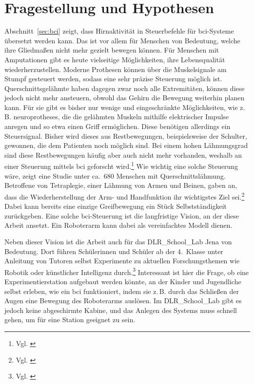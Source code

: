 \section{Fragestellung und Hypothesen}
\label{sec:fragestellung}

Abschnitt~\ref{sec:bci} zeigt, dass Hirnaktivität in Steuerbefehle für \acrshort{bci}-Systeme übersetzt werden kann. Das ist vor allem für Menschen von Bedeutung, welche ihre Gliedmaßen nicht mehr gezielt bewegen können. Für Menschen mit Amputationen gibt es heute vielseitige Möglichkeiten, ihre Lebensqualität wiederherzustellen. Moderne Prothesen können über die Muskelsignale am Stumpf gesteuert werden, sodass eine sehr präzise Steuerung möglich ist. Querschnittsgelähmte haben dagegen zwar noch alle Extremitäten, können diese jedoch nicht mehr ansteuern, obwohl das Gehirn die Bewegung weiterhin planen kann. Für sie gibt es bisher nur wenige und eingeschränkte Möglichkeiten, wie z.\,B. \glspl{neuroprothese}, die die gelähmten Muskeln mithilfe elektrischer Impulse anregen und so etwa einen Griff ermöglichen. Diese benötigen allerdings ein Steuersignal. Bisher wird dieses aus Restbewegungen, beispielsweise der Schulter, gewonnen, die dem Patienten noch möglich sind. Bei einem hohen Lähmungsgrad sind diese Restbewegungen häufig aber auch nicht mehr vorhanden, weshalb an einer Steuerung mittels \acrshort{bci} geforscht wird.\footnote{Vgl. \cite[S.~6~f.]{rupp2014_bci_sci}} Wie wichtig eine solche Steuerung wäre, zeigt eine Studie unter ca.~680 Menschen mit Querschnittslähmung. Betroffene von Tetraplegie, einer Lähmung von Armen und Beinen, gaben an, dass die Wiederherstellung der Arm- und Handfunktion ihr wichtigstes Ziel sei.\footnote{Vgl. \cite[S.~1371--1383]{anderson2004}} Dabei kann bereits eine einzige Greifbewegung ein Stück Selbstständigkeit zurückgeben. Eine solche \acrshort{bci}-Steuerung ist die langfristige Vision, an der diese Arbeit ansetzt. Ein Roboterarm kann dabei als vereinfachtes Modell dienen.

Neben dieser Vision ist die Arbeit auch für das DLR\_\allowbreak School\_\allowbreak Lab Jena von Bedeutung. Dort führen Schülerinnen und Schüler ab der 4.~Klasse unter Anleitung von Tutoren selbst Experimente zu aktuellen Forschungsthemen wie Robotik oder künstlicher Intelligenz durch.\footnote{Vgl. \cite{dlr_schoollab_jena}} Interessant ist hier die Frage, ob eine Experimentierstation aufgebaut werden könnte, an der Kinder und Jugendliche selbst erleben, wie ein \acrshort{bci} funktioniert, indem sie z.\,B. durch das Schließen der Augen eine Bewegung des Roboterarms auslösen. Im DLR\_\allowbreak School\_\allowbreak Lab gibt es jedoch keine abgeschirmte Kabine, und das Anlegen des Systems muss schnell gehen, um für eine Station geeignet zu sein.

